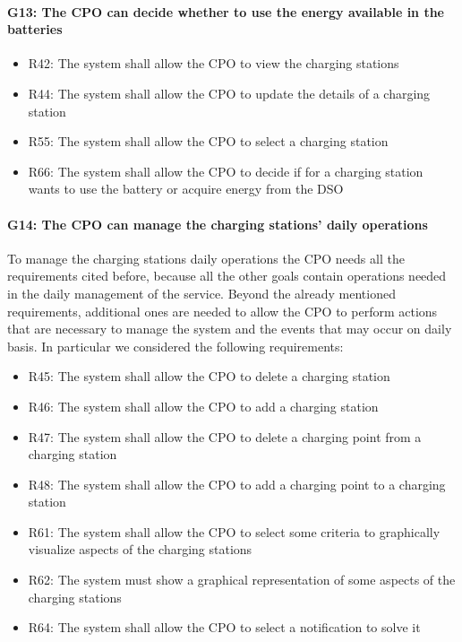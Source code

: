 \paragraph{G13: The CPO can decide whether to use the energy available in the batteries}
\begin{itemize}
    \item R42: The system shall allow the CPO to view the charging stations
    \item R44: The system shall allow the CPO to update the details of a charging station
    \item R55: The system shall allow the CPO to select a charging station
    \item R66: The system shall allow the CPO to decide if for a charging station wants to use the battery or acquire energy from the DSO
\end{itemize}


\paragraph{G14: The CPO can manage the charging stations' daily operations}
To manage the charging stations daily operations the CPO needs all the requirements cited before, because all the other goals contain operations needed in the daily management of the service. Beyond the already mentioned requirements, additional ones are needed to allow the CPO to perform actions that are necessary to manage the system and the events that may occur on daily basis. In particular we considered the following requirements:
\begin{itemize}
     \item R45: The system shall allow the CPO to delete a charging station
     \item R46: The system shall allow the CPO to add a charging station
     \item R47: The system shall allow the CPO to delete a charging point from a charging station
     \item R48: The system shall allow the CPO to add a charging point to a charging station
     \item R61: The system shall allow the CPO to select some criteria to graphically visualize aspects of the charging stations
     \item R62: The system must show a graphical representation of some aspects of the charging stations
     \item R64: The system shall allow the CPO to select a notification to solve it
\end{itemize}